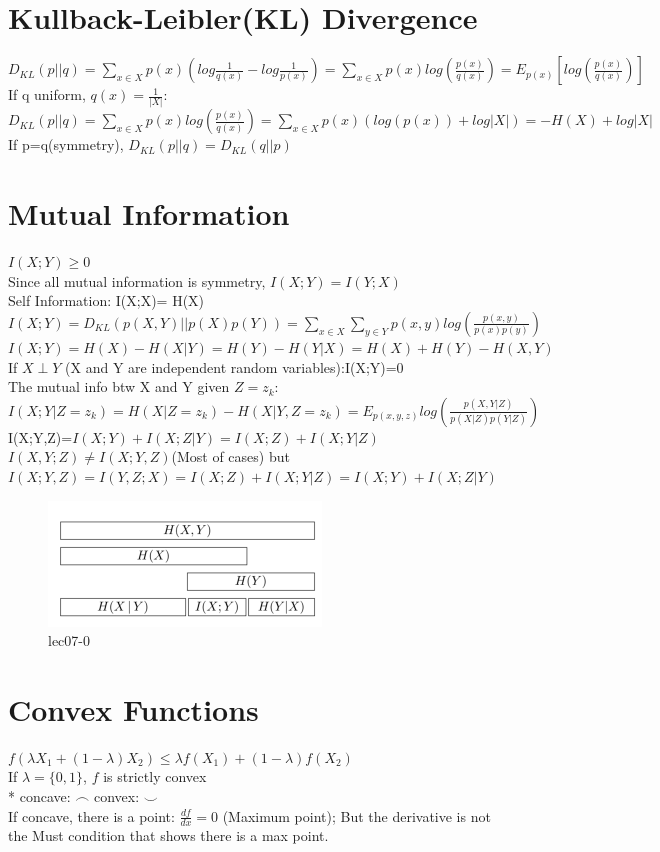 \documentclass[12pt,a4paper]{extarticle}
\begin{document}
\section{Kullback-Leibler(KL) Divergence}
$D_{KL}(p||q)=\sum_{x\in X}p(x)(log\frac{1}{q(x)}-log\frac{1}{p(x)})=\sum_{x\in X} p(x)log(\frac{p(x)}{q(x)})=E_{p(x)}[log(\frac{p(x)}{q(x)})]$\\
If q uniform, $q(x)= \frac{1}{|X|}$:\quad $D_{KL}(p||q)=\sum_{x\in X} p(x)log(\frac{p(x)}{q(x)})= \sum_{x\in X}p(x)(log(p(x))+log|X|)=-H(X)+log|X|$\\
If p=q(symmetry), $D_{KL}(p||q)=D_{KL}(q||p)$\\


\section{Mutual Information}
$I(X;Y)\geq 0$\\
Since all mutual information is symmetry, $I(X;Y)=I(Y;X)$\\
Self Information: I(X;X)= H(X)\\
$I(X;Y)=D_{KL}(p(X,Y)||p(X)p(Y))=\sum_{x\in X}\sum_{y\in Y}p(x,y)log(\frac{p(x,y)}{p(x)p(y)})$\\
$I(X;Y)=H(X)-H(X|Y)=H(Y)-H(Y|X)=H(X)+H(Y)-H(X,Y)$\\
If $X \perp Y$ (X and Y are independent random variables):I(X;Y)=0\\
The mutual info btw X and Y given $Z=z_k$: $I(X;Y|Z=z_k)=H(X|Z=z_k)-H(X|Y,Z=z_k)=E_{p(x,y,z)}log(\frac{p(X,Y|Z)}{p(X|Z)p(Y|Z)})$\\
I(X;Y,Z)=$I(X;Y)+I(X;Z|Y)=I(X;Z)+I(X;Y|Z)$\\
$I(X,Y;Z) \neq I(X;Y,Z)$(Most of cases) but $I(X;Y,Z)=I(Y,Z;X)=I(X;Z)+I(X;Y|Z)=I(X;Y)+I(X;Z|Y)$\\

\begin{figure}
  \includegraphics{img/lec7-0}
  \caption{lec07-0}
  \label{fig:lec07-0}
\end{figure}

\section{Convex Functions}
$f(\lambda X_1+(1-\lambda)X_2)\leq \lambda f(X_1)+(1-\lambda)f(X_2)$\\
If $\lambda = \{0,1\}$, $f$ is strictly convex\\
* concave: $\frown$ \quad convex: $\smile$\\
If concave, there is a point: $\frac{df}{dx}=0$ (Maximum point); But the derivative is not the Must condition that shows there is a max point.\\
\end{document}
